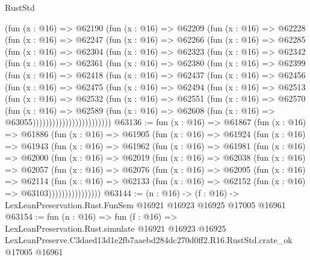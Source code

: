 \begin{lexlean}{RustStd}
\begin{coremodule}
    (fun (x : @16) =>
    @62190
      (fun (x : @16) =>
      @62209
        (fun (x : @16) =>
        @62228
          (fun (x : @16) =>
          @62247
            (fun (x : @16) =>
            @62266
              (fun (x : @16) =>
              @62285
                (fun (x : @16) =>
                @62304
                  (fun (x : @16) =>
                  @62323
                    (fun (x : @16) =>
                    @62342
                      (fun (x : @16) =>
                      @62361
                        (fun (x : @16) =>
                        @62380
                          (fun (x : @16) =>
                          @62399
                            (fun (x : @16) =>
                            @62418
                              (fun (x : @16) =>
                              @62437
                                (fun (x : @16) =>
                                @62456
                                  (fun (x : @16) =>
                                  @62475
                                    (fun (x : @16) =>
                                    @62494
                                      (fun (x : @16) =>
                                      @62513
                                        (fun (x : @16) =>
                                        @62532
                                          (fun (x : @16) =>
                                          @62551
                                            (fun (x : @16) =>
                                            @62570
                                              (fun (x : @16) =>
                                              @62589
                                                (fun (x : @16) =>
                                                @62608
                                                  (fun (x : @16) => @63055))))))))))))))))))))))))
@63136 := fun (x : @16) =>
  @61867
    (fun (x : @16) =>
    @61886
      (fun (x : @16) =>
      @61905
        (fun (x : @16) =>
        @61924
          (fun (x : @16) =>
          @61943
            (fun (x : @16) =>
            @61962
              (fun (x : @16) =>
              @61981
                (fun (x : @16) =>
                @62000
                  (fun (x : @16) =>
                  @62019
                    (fun (x : @16) =>
                    @62038
                      (fun (x : @16) =>
                      @62057
                        (fun (x : @16) =>
                        @62076
                          (fun (x : @16) =>
                          @62095
                            (fun (x : @16) =>
                            @62114
                              (fun (x : @16) =>
                              @62133
                                (fun (x : @16) => @62152 (fun (x : @16) => @63103))))))))))))))))
@63144 := (n : @16) ->
  (f : @16) -> LexLeanPreservation.Rust.FunSem @16921 @16923 @16925 @17005 @16961
@63154 := fun (n : @16) =>
  fun (f : @16) =>
  LexLeanPreservation.Rust.simulate
    @16921
    @16923
    @16925
    LexLeanPreserve.C3daed13d1e2fb7aaebd284dc270d0ff2.R16.RustStd.crate_ok
    @17005
    @16961
\end{coremodule}
\end{lexlean}
